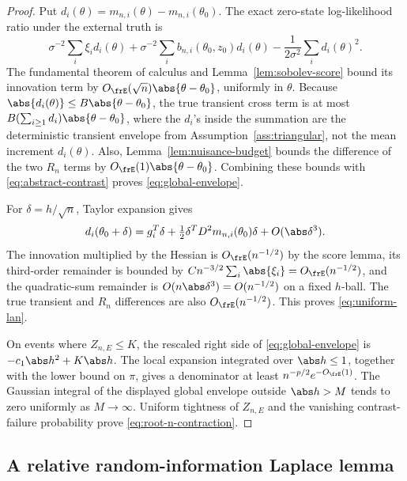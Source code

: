 \begin{proof}
Put \(d_i(\theta)=m_{n,i}(\theta)-m_{n,i}(\theta_0)\).  The exact zero-state
log-likelihood ratio under the external truth is
\begin{equation}
 \sigma^{-2}\sum_i\xi_i d_i(\theta)
 +\sigma^{-2}\sum_i b_{n,i}(\theta_0,z_0)d_i(\theta)
 -\frac1{2\sigma^2}\sum_i d_i(\theta)^2.
 \label{eq:exact-zero-state-ratio}
\end{equation}
The fundamental theorem of calculus and
Lemma~\ref{lem:sobolev-score} bound its innovation term by
\(O_{\frE}(\sqrt n)\abs{\theta-\theta_0}\), uniformly in \(\theta\).  Because \(\abs{d_i(\theta)}\le B\abs{\theta-\theta_0}\), the true
transient cross term is at most
\(B(\sum_{i\ge1}d_i)\abs{\theta-\theta_0}\), where the \(d_i\)'s inside
the summation are the deterministic transient envelope from
Assumption~\ref{ass:triangular}, not the mean increment \(d_i(\theta)\).  Also,
Lemma~\ref{lem:nuisance-budget} bounds the difference of the two \(R_n\)
terms by \(O_{\frE}(1)\abs{\theta-\theta_0}\).  Combining these bounds with
\eqref{eq:abstract-contrast} proves \eqref{eq:global-envelope}.

For \(\delta=h/\sqrt n\), Taylor expansion gives
\[
 d_i(\theta_0+\delta)=g_i^T\delta
 +\tfrac12\delta^TD^2m_{n,i}(\theta_0)\delta+O(\abs\delta^3).
\]
The innovation multiplied by the Hessian is \(O_{\frE}(n^{-1/2})\) by the
score lemma, its third-order remainder is bounded by
\(Cn^{-3/2}\sum_i\abs{\xi_i}=O_{\frE}(n^{-1/2})\), and the quadratic-sum
remainder is \(O(n\abs\delta^3)=O(n^{-1/2})\) on a fixed \(h\)-ball.  The
true transient and \(R_n\) differences are also \(O_{\frE}(n^{-1/2})\).
This proves \eqref{eq:uniform-lan}.

On events where \(Z_{n,E}\le K\), the rescaled right side of
\eqref{eq:global-envelope} is \(-c_1\abs h^2+K\abs h\).  The local expansion
integrated over \(\abs h\le1\), together with the lower bound on \(\pi\),
gives a denominator at least \(n^{-p/2}e^{-O_{\frE}(1)}\).  The Gaussian
integral of the displayed global envelope outside \(\abs h>M\) tends to zero
uniformly as \(M\to\infty\).  Uniform tightness of \(Z_{n,E}\) and the
vanishing contrast-failure probability prove \eqref{eq:root-n-contraction}.
\end{proof}

\subsection{A relative random-information Laplace lemma}


